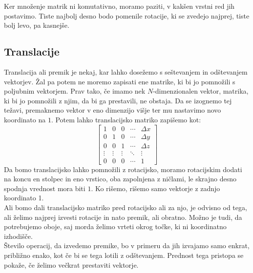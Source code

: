 \documentclass[a4paper, 12px]{article}
\begin{document}
    Ker množenje matrik ni komutativno, moramo paziti, v kakšen vrstni red jih postavimo. Tiste najbolj desno
    bodo pomenile rotacije, ki se zvedejo najprej, tiste bolj levo, pa kasnejše.\cite{3D-projection}

\subsection{Translacije}
    Translacija ali premik je nekaj, kar lahko dosežemo s seštevanjem in odštevanjem vektorjev.
    Žal pa potem ne moremo zapisati ene matrike, ki bi jo pomnožili s poljubnim vektorjem.
    Prav tako, če imamo nek $N$-dimenzionalen vektor, matrika, ki bi jo pomnožili z njim, da bi ga prestavili,
    ne obstaja. Da se izognemo tej težavi, premaknemo vektor v eno dimenzijo višje ter mu nastavimo novo koordinato na $1$.
    Potem lahko translacijsko matriko zapišemo kot:
    $$\begin{bmatrix}
        1 & 0 & 0 & \cdots & \Delta x \\
        0 & 1 & 0 & \cdots & \Delta y \\
        0 & 0 & 1 & \cdots & \Delta z \\
        \vdots & \vdots & \vdots & \ddots & \vdots \\
        0 & 0 & 0 & \cdots & 1
    \end{bmatrix}$$
    Da bomo translacijsko lahko pomnožili z rotacijsko, moramo rotacijskim dodati na koncu en stolpec in eno vrstico,
    oba zapolnjena z ničlami, le skrajno desno spodnja vrednost mora biti $1$. Ko rišemo, rišemo samo vektorje z zadnjo koordinato 1.\\

    Ali bomo dali translacijsko matriko pred rotacijsko ali za njo, je odvisno od tega, ali želimo najprej izvesti
    rotacije in nato premik, ali obratno. Možno je tudi, da potrebujemo oboje, saj morda želimo vrteti okrog točke, ki
    ni koordinatno izhodišče.\\

    Število operacij, da izvedemo premike, bo v primeru da jih izvajamo samo enkrat, približno enako, kot če bi se tega 
    lotili z odštevanjem. Prednost tega pristopa se pokaže, če želimo večkrat prestaviti vektorje.\cite{TransformationWiki}
\end{document}
